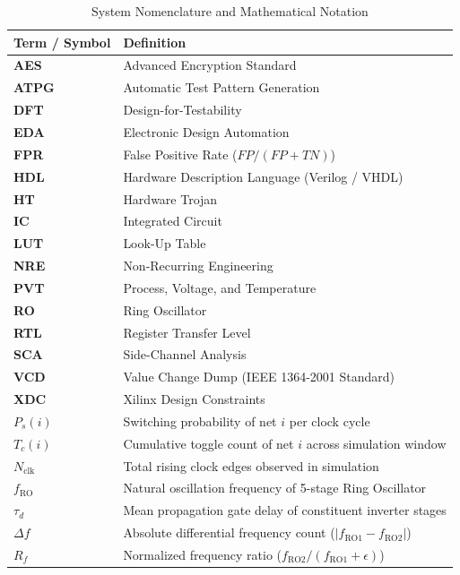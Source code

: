 \documentclass[11pt,a4paper,oneside]{book}
\begin{document}
\begin{table}[h!]
\centering
\begin{tabularx}{\textwidth}{l X}
\toprule
\textbf{Term / Symbol} & \textbf{Definition} \\
\midrule
\textbf{AES} & Advanced Encryption Standard \\
\textbf{ATPG} & Automatic Test Pattern Generation \\
\textbf{DFT} & Design-for-Testability \\
\textbf{EDA} & Electronic Design Automation \\
\textbf{FPR} & False Positive Rate ($FP / (FP + TN)$) \\
\textbf{HDL} & Hardware Description Language (Verilog / VHDL) \\
\textbf{HT} & Hardware Trojan \\
\textbf{IC} & Integrated Circuit \\
\textbf{LUT} & Look-Up Table \\
\textbf{NRE} & Non-Recurring Engineering \\
\textbf{PVT} & Process, Voltage, and Temperature \\
\textbf{RO} & Ring Oscillator \\
\textbf{RTL} & Register Transfer Level \\
\textbf{SCA} & Side-Channel Analysis \\
\textbf{VCD} & Value Change Dump (IEEE 1364-2001 Standard) \\
\textbf{XDC} & Xilinx Design Constraints \\
\hline
$P_s(i)$ & Switching probability of net $i$ per clock cycle \\
$T_c(i)$ & Cumulative toggle count of net $i$ across simulation window \\
$N_{\text{clk}}$ & Total rising clock edges observed in simulation \\
$f_{\text{RO}}$ & Natural oscillation frequency of 5-stage Ring Oscillator \\
$\tau_d$ & Mean propagation gate delay of constituent inverter stages \\
$\Delta f$ & Absolute differential frequency count ($|f_{\text{RO1}} - f_{\text{RO2}}|$) \\
$R_f$ & Normalized frequency ratio ($f_{\text{RO2}} / (f_{\text{RO1}} + \epsilon)$) \\
\bottomrule
\end{tabularx}
\caption{System Nomenclature and Mathematical Notation}
\end{table}
\end{document}
